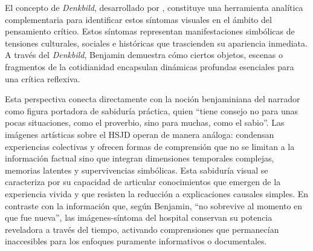 El concepto de \textit{Denkbild}, desarrollado por \parencite{Benjamin2004}, constituye una herramienta analítica complementaria para identificar estos síntomas visuales en el ámbito del pensamiento crítico. Estos síntomas representan manifestaciones simbólicas de tensiones culturales, sociales e históricas que trascienden su apariencia inmediata. A través del \textit{Denkbild}, Benjamin demuestra cómo ciertos objetos, escenas o fragmentos de la cotidianidad encapsulan dinámicas profundas esenciales para una crítica reflexiva.

Esta perspectiva conecta directamente con la noción benjaminiana del narrador como figura portadora de sabiduría práctica, quien ``tiene consejo no para unas pocas situaciones, como el proverbio, sino para muchas, como el sabio''. Las imágenes artísticas sobre el HSJD operan de manera análoga: condensan experiencias colectivas y ofrecen formas de comprensión que no se limitan a la información factual sino que integran dimensiones temporales complejas, memorias latentes y supervivencias simbólicas. Esta sabiduría visual se caracteriza por su capacidad de articular conocimientos que emergen de la experiencia vivida y que resisten la reducción a explicaciones causales simples. En contraste con la información que, según Benjamin, ``no sobrevive al momento en que fue nueva'', las imágenes-síntoma del hospital conservan su potencia reveladora a través del tiempo, activando comprensiones que permanecían inaccesibles para los enfoques puramente informativos o documentales.

